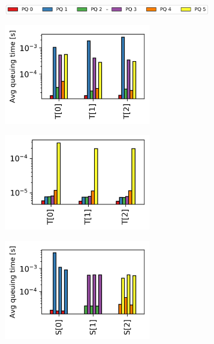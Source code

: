 \begin{figure}[!tb]
	\centering
	\begin{subfigure}{.6\linewidth}
		\hspace{6pt}
		\includegraphics[width=0.99\textwidth]{Chapter4/Figures/legend}
	\end{subfigure}%
	\vfill
	\centering
	\begin{subfigure}{.5\textwidth}
		\centering
		\includegraphics[width=0.7\textwidth]{Chapter4/Figures/sdmlfq-sp-tor_3x2}
	\end{subfigure}%
	\hfill
	\begin{subfigure}{.5\textwidth}
		\centering
		\includegraphics[width=0.7\textwidth]{Chapter4/Figures/esn-sp-tor_3x2}
	\end{subfigure}%
	\vfill
	\begin{subfigure}{.5\textwidth}
		\centering
		\includegraphics[width=0.7\textwidth]{Chapter4/Figures/sdmlfq-sp-spine_3x2}

\end{subfigure}
\end{figure}
